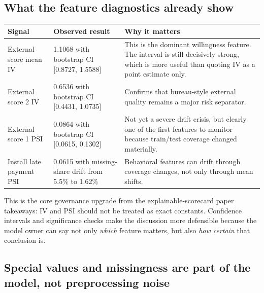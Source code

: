 \documentclass[11pt]{article}
\begin{document}
\subsection{What the feature diagnostics already show}

{\small
\begin{tabularx}{\textwidth}{@{}P{0.26\textwidth}P{0.21\textwidth}Y@{}}
\toprule
Signal & Observed result & Why it matters \\
\midrule
External score mean IV & 1.1068 with bootstrap CI [0.8727, 1.5588] & This is the dominant willingness feature. The interval is still decisively strong, which is more useful than quoting IV as a point estimate only. \\
External score 2 IV & 0.6536 with bootstrap CI [0.4431, 1.0735] & Confirms that bureau-style external quality remains a major risk separator. \\
External score 1 PSI & 0.0864 with bootstrap CI [0.0615, 0.1302] & Not yet a severe drift crisis, but clearly one of the first features to monitor because train/test coverage changed materially. \\
Install late payment PSI & 0.0615 with missing-share drift from 5.5\% to 1.62\% & Behavioral features can drift through coverage changes, not only through mean shifts. \\
\bottomrule
\end{tabularx}
}

This is the core governance upgrade from the explainable-scorecard paper takeaways: IV and PSI should not be treated as exact constants. Confidence intervals and significance checks make the discussion more defensible because the model owner can say not only \emph{which} feature matters, but also \emph{how certain} that conclusion is.

\subsection{Special values and missingness are part of the model, not preprocessing noise}
\end{document}
